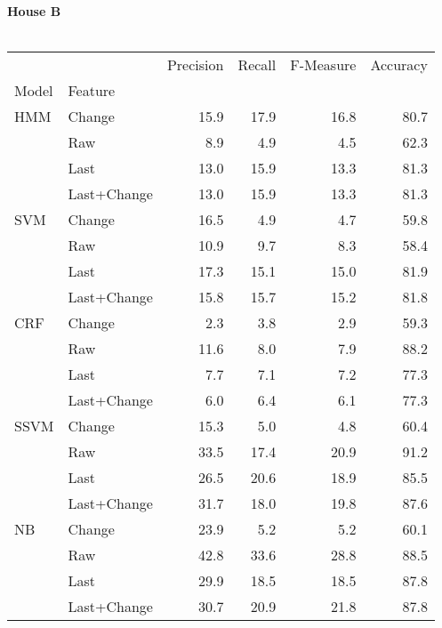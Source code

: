 \documentclass{article}
\begin{document}
\textbf{House B}\\
\vspace{1cm}\\
\begin{tabular}{llrrrr}
\toprule
    &        &  Precision &  Recall &  F-Measure &  Accuracy \\
Model & Feature &            &         &            &           \\
\midrule
HMM & Change &       15.9 &    17.9 &       16.8 &      80.7 \\
    & Raw &        8.9 &     4.9 &        4.5 &      62.3 \\
    & Last &       13.0 &    15.9 &       13.3 &      81.3 \\
    & Last+Change &       13.0 &    15.9 &       13.3 &      81.3 \\
SVM & Change &       16.5 &     4.9 &        4.7 &      59.8 \\
    & Raw &       10.9 &     9.7 &        8.3 &      58.4 \\
    & Last &       17.3 &    15.1 &       15.0 &      81.9 \\
    & Last+Change &       15.8 &    15.7 &       15.2 &      81.8 \\
CRF & Change &        2.3 &     3.8 &        2.9 &      59.3 \\
    & Raw &       11.6 &     8.0 &        7.9 &      88.2 \\
    & Last &        7.7 &     7.1 &        7.2 &      77.3 \\
    & Last+Change &        6.0 &     6.4 &        6.1 &      77.3 \\
SSVM & Change &       15.3 &     5.0 &        4.8 &      60.4 \\
    & Raw &       33.5 &    17.4 &       20.9 &      91.2 \\
    & Last &       26.5 &    20.6 &       18.9 &      85.5 \\
    & Last+Change &       31.7 &    18.0 &       19.8 &      87.6 \\
NB & Change &       23.9 &     5.2 &        5.2 &      60.1 \\
    & Raw &       42.8 &    33.6 &       28.8 &      88.5 \\
    & Last &       29.9 &    18.5 &       18.5 &      87.8 \\
    & Last+Change &       30.7 &    20.9 &       21.8 &      87.8 \\
\bottomrule
\end{tabular}
\vspace{1cm}\\
\end{document}
